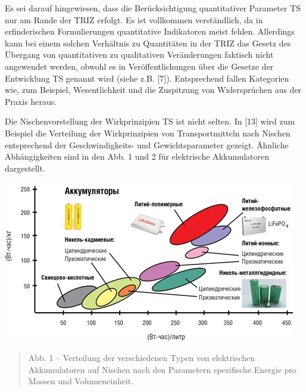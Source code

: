 \documentclass[11pt,a4paper]{article}
\begin{document}
\begin{emph}
  Es sei darauf hingewiesen, dass die Berücksichtigung quantitativer Parameter
  TS nur am Rande der TRIZ erfolgt. Es ist vollkommen verständlich, da in
  erfinderischen Formulierungen quantitative Indikatoren meist fehlen.
  Allerdings kann bei einem solchen Verhältnis zu Quantitäten in der TRIZ das
  Gesetz des Übergang von quantitativen zu qualitativen Veränderungen faktisch
  nicht angewendet werden, obwohl es in Veröffentlichungen über die Gesetze
  der Entwicklung TS genannt wird (siehe z.B. [7]). Entsprechend fallen
  Kategorien wie, zum Beispiel, Wesentlichkeit und die Zuspitzung von
  Widersprüchen aus der Praxis heraus.
\end{emph}
Die Nischenvorstellung der Wirkprinzipien TS ist nicht selten.  In [13] wird
zum Beispiel die Verteilung der Wirkprinzipien von Transportmitteln nach
Nischen entsprechend der Geschwindigkeits- und Gewichtsparameter gezeigt.
Ähnliche Abhängigkeiten sind in den Abb. 1 und 2 für elektrische Akkumulatoren
dargestellt.
\begin{center}
  \includegraphics[width=.7\textwidth]{2164-1.jpg}
  \begin{quote}
    Abb. 1 -- Verteilung der verschiedenen Typen von elektrischen
    Akkumulatoren auf Nischen nach den Parametern spezifische Energie pro
    Massen und Volumeneinheit.
  \end{quote}
\end{center}
\end{document}
